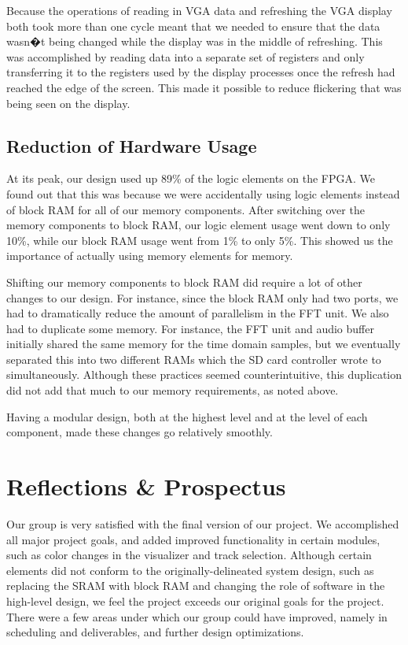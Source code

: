 \documentclass{article}
\begin{document}
Because the operations of reading in VGA data and refreshing the VGA display both 
took more than one cycle meant that we needed to ensure that the data wasn�t being 
changed while the display was in the middle of refreshing. This was accomplished by 
reading data into a separate set of registers and only transferring it to the registers 
used by the display processes once the refresh had reached the edge of the screen.  
This made it possible to reduce flickering that was being seen on the display.

\subsection{Reduction of Hardware Usage}

At its peak, our design used up 89\% of the logic elements on the FPGA. We found out 
that this was because we were accidentally using logic elements instead of block 
RAM for all of our memory components. After switching over the memory components 
to block RAM, our logic element usage went down to only 10\%, while our block RAM 
usage went from 1\% to only 5\%. This showed us the importance of actually using 
memory elements for memory.

Shifting our memory components to block RAM did require a lot of other changes to 
our design. For instance, since the block RAM only had two ports, we had to 
dramatically reduce the amount of parallelism in the FFT unit. We also had to 
duplicate some memory. For instance, the FFT unit and audio buffer initially shared 
the same memory for the time domain samples, but we eventually separated this into 
two different RAMs which the SD card controller wrote to simultaneously. Although 
these practices seemed counterintuitive, this duplication did not add that much to our 
memory requirements, as noted above. 

Having a modular design, both at the highest level and at the level of each
component, made these changes go relatively smoothly.

\section{Reflections \& Prospectus}

Our group is very satisfied with the final version of our project. We accomplished all 
major project goals, and added improved functionality in certain modules, such as 
color changes in the visualizer and track selection. Although certain elements did not 
conform to the originally-delineated system design, such as replacing the SRAM with 
block RAM and changing the role of software in the high-level design, we feel the 
project exceeds our original goals for the project. There were a few areas under 
which our group could have improved, namely in scheduling and deliverables, and 
further design optimizations.
\end{document}
